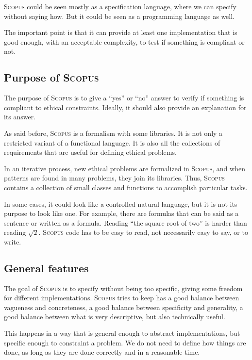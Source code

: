 \documentclass[12pt,a4paper]{article}
\newcommand{\Scopus}{\textsc{Scopus}\xspace}
\begin{document}
    \Scopus could be seen mostly as a specification language, where we can specify without saying how.
    But it could be seen as a programming language as well.

    The important point is that it can provide at least one implementation that is good enough, with an acceptable complexity, to test if something is compliant or not.

    \subsection{Purpose of \Scopus}

    The purpose of \Scopus is to give a ``yes'' or ``no'' answer to verify if something is compliant to ethical constraints.
    Ideally, it should also provide an explanation for its answer.

    As said before, \Scopus is a formalism with some libraries.
    It is not only a restricted variant of a functional language.
    It is also all the collections of requirements that are useful for defining ethical problems.

    In an iterative process, new ethical problems are formalized in \Scopus, and when patterns are found in many problems, they join its libraries.
    Thus, \Scopus contains a collection of small classes and functions to accomplish particular tasks.

    In some cases, it could look like a controlled natural language, but it is not its purpose to look like one.
    For example, there are formulas that can be said as a sentence or written as a formula.
    Reading ``the square root of two'' is harder than reading $\sqrt{2}$.
    \Scopus code has to be easy to read, not necessarily easy to say, or to write.

    \subsection{General features}

    The goal of \Scopus is to specify without being too specific, giving some freedom for different implementations.
    \Scopus tries to keep has a good balance between vagueness and concreteness, a good balance between specificity and generality,
    a good balance between what is very descriptive, but also technically useful.

    This happens in a way that is general enough to abstract implementations, but specific enough to constraint a problem.
    We do not need to define how things are done, as long as they are done correctly and in a reasonable time.
\end{document}
